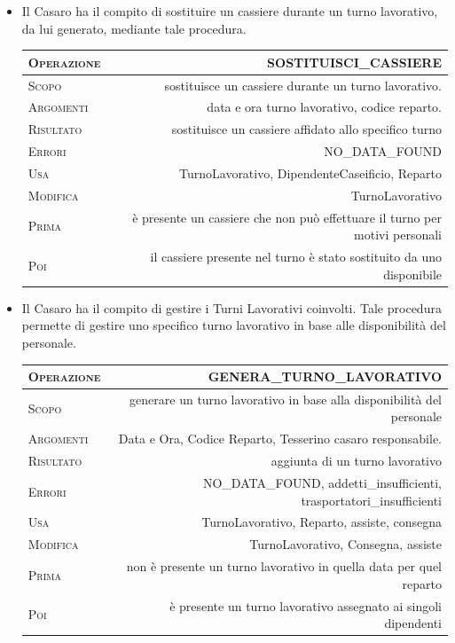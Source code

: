 \documentclass[12pt]{report}
\begin{document}
\begin{itemize}
\item {Il Casaro ha il compito di sostituire un cassiere durante un turno lavorativo, da lui generato, mediante tale procedura. }

\begin{center}
 \begin{tabular}{l | r} 
 \textsc{Operazione} & SOSTITUISCI\_CASSIERE \\ [0.5ex] 
 \hline
 \textsc{Scopo} & sostituisce un cassiere durante un turno lavorativo. \\ 
 \textsc{Argomenti} & data e ora turno lavorativo, codice reparto. \\
 \textsc{Risultato} & sostituisce un cassiere affidato allo specifico turno\\
 \textsc{Errori}& NO\_DATA\_FOUND\\
 \textsc{Usa} & TurnoLavorativo, DipendenteCaseificio, Reparto\\ 
 \textsc{Modifica} & TurnoLavorativo \\ 
 \textsc{Prima} & è presente un cassiere che non può effettuare il turno per motivi personali\\ 
 \textsc{Poi} & il cassiere presente nel turno è stato sostituito da uno disponibile\\ [1ex] 
\end{tabular}
\end{center}

\item {Il Casaro ha il compito di gestire i Turni Lavorativi coinvolti. Tale procedura permette di gestire uno specifico turno lavorativo in base alle disponibilità del personale.  }

\begin{center}
 \begin{tabular}{l | r} 
 \textsc{Operazione} & GENERA\_TURNO\_LAVORATIVO \\ [0.5ex] 
 \hline
 \textsc{Scopo} & generare un turno lavorativo in base alla disponibilità del personale \\ 
 \textsc{Argomenti} & Data e Ora, Codice Reparto, Tesserino casaro responsabile. \\
 \textsc{Risultato} & aggiunta di un turno lavorativo\\
 \textsc{Errori}& NO\_DATA\_FOUND, addetti\_insufficienti, trasportatori\_insufficienti\\
 \textsc{Usa} & TurnoLavorativo, Reparto, assiste, consegna\\ 
 \textsc{Modifica} & TurnoLavorativo, Consegna, assiste\\ 
 \textsc{Prima} & non è presente un turno lavorativo in quella data per quel reparto\\ 
 \textsc{Poi} & è presente un turno lavorativo assegnato ai singoli dipendenti\\ [1ex] 
\end{tabular}
\end{center}


\end{itemize}
\end{document}
